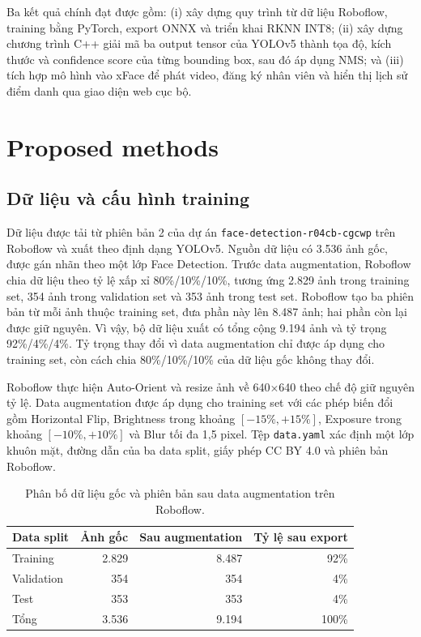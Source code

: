 \documentclass[11pt,a4paper]{article}
\begin{document}
Ba kết quả chính đạt được gồm: (i) xây dựng quy trình từ dữ liệu Roboflow, training bằng PyTorch, export ONNX và triển khai RKNN INT8; (ii) xây dựng chương trình C++ giải mã ba output tensor của YOLOv5 thành tọa độ, kích thước và confidence score của từng bounding box, sau đó áp dụng NMS; và (iii) tích hợp mô hình vào xFace để phát video, đăng ký nhân viên và hiển thị lịch sử điểm danh qua giao diện web cục bộ.

\section{Proposed methods}

\subsection{Dữ liệu và cấu hình training}

Dữ liệu được tải từ phiên bản 2 của dự án \texttt{face-detection-r04cb-cgcwp} trên Roboflow và xuất theo định dạng YOLOv5. Nguồn dữ liệu có 3.536 ảnh gốc, được gán nhãn theo một lớp Face Detection. Trước data augmentation, Roboflow chia dữ liệu theo tỷ lệ xấp xỉ 80\%/10\%/10\%, tương ứng 2.829 ảnh trong training set, 354 ảnh trong validation set và 353 ảnh trong test set. Roboflow tạo ba phiên bản từ mỗi ảnh thuộc training set, đưa phần này lên 8.487 ảnh; hai phần còn lại được giữ nguyên. Vì vậy, bộ dữ liệu xuất có tổng cộng 9.194 ảnh và tỷ trọng 92\%/4\%/4\%. Tỷ trọng thay đổi vì data augmentation chỉ được áp dụng cho training set, còn cách chia 80\%/10\%/10\% của dữ liệu gốc không thay đổi.

Roboflow thực hiện Auto-Orient và resize ảnh về 640$\times$640 theo chế độ giữ nguyên tỷ lệ. Data augmentation được áp dụng cho training set với các phép biến đổi gồm Horizontal Flip, Brightness trong khoảng $[-15\%,+15\%]$, Exposure trong khoảng $[-10\%,+10\%]$ và Blur tối đa 1,5 pixel. Tệp \texttt{data.yaml} xác định một lớp khuôn mặt, đường dẫn của ba data split, giấy phép CC BY 4.0 và phiên bản Roboflow.

\begin{table}[H]
\centering
\caption{Phân bố dữ liệu gốc và phiên bản sau data augmentation trên Roboflow.}
\label{tab:data}
\begin{tabular}{lrrr}
\toprule
Data split & Ảnh gốc & Sau augmentation & Tỷ lệ sau export \\
\midrule
Training & 2.829 & 8.487 & 92\% \\
Validation & 354 & 354 & 4\% \\
Test & 353 & 353 & 4\% \\
\midrule
Tổng & 3.536 & 9.194 & 100\% \\
\bottomrule
\end{tabular}
\end{table}
\end{document}
